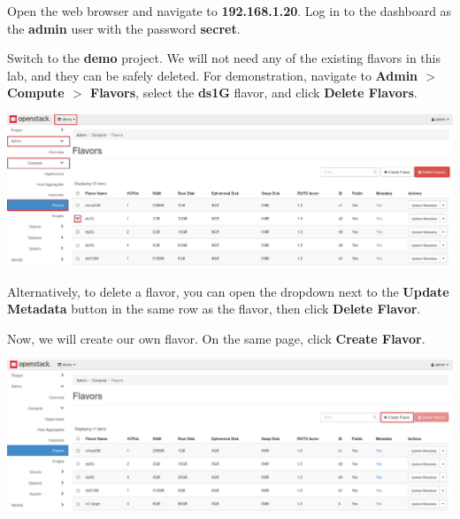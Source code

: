\documentclass[letterpaper, 12pt]{article}
\begin{document}
\begin{enumerate}
    \begin{labstep}
        Open the web browser and navigate to \textbf{192.168.1.20}.
        Log in to the dashboard as the \textbf{admin} user with the password \textbf{secret}.
    \end{labstep}

    \begin{labstep}
        Switch to the \textbf{demo} project.
        We will not need any of the existing flavors in this lab, and they can be safely deleted.
        For demonstration, navigate to \textbf{Admin $>$ Compute $>$ Flavors}, select the \textbf{ds1G} flavor, and click \textbf{Delete Flavors}.

        \begin{center}
            \includegraphics[width=\linewidth]{images/part2/step2.png}
        \end{center}
    \end{labstep}

    \begin{tipbox}
        Alternatively, to delete a flavor, you can open the dropdown next to the \textbf{Update Metadata} button in the same row as the flavor, then click \textbf{Delete Flavor}.
    \end{tipbox}

    \begin{labstep}
        Now, we will create our own flavor.
        On the same page, click \textbf{Create Flavor}.

        \begin{center}
            \includegraphics[width=\linewidth]{images/part2/step3.png}
        \end{center}
    \end{labstep}


\end{enumerate}
\end{document}
